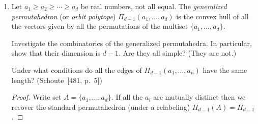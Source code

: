 \documentclass{article}
\begin{document}
\begin{enumerate}
\begin{proof}
Furthermore, $\Pi_{d-1}$ is simple because every vertex is contained exactly $d-1$ facets, which are exactly the $d-1$ cuts one can make which splits the length $d$ list (its coordinate) into two nontrivial lists (ordered partition into $2$ parts). Equivalently, every vertex is in exactly $d-1$ edges, corresponding to the $d-1$ adjacent transpositions one can make. (The vertices one adjacent transposition away are its neighbors, and adjacent here refers to the ordering of the ground set $d>d-1>\ldots > 1$)

\smallskip
Its $2^d-2$ facets correspond to the identity
\[\sum_{i=0}^{d} \binom{d}{i} = 2^d\]
which is the number of ways to split $[d]$ into two (possibly empty) sets. Since we require each set to be non-empty, we lose the partitions $(\varnothing, [d])$ and $([d], \varnothing)$, thus giving $2^d-2$ facets. Let $(S_i)_{i=1}^{2^d-2}$ be all the non-empty proper subsets of $[d]$. The hyperplanes are exactly
\[\sum_{k \in S_i} x_k \geq \sum_{k=1}^{|S_i|}k = \frac{|S_i|(|S_i|+1)}{2}\]
for each facet corresponding to $(S_i, [d] \setminus S_i)$.

\begin{remark}
Let the (cartesian) directions in $\mathbb{R}^d$ be $x_1, \dots, x_d$. Let $P$ be the plane $\sum_{i=1}^d x_i = \sum_{i=1}^d$. We have that $\Pi_{d-1} \subseteq P$, so if we take $P$ as $\mathbb{R}^{d-1}$ (via an affine transformation) we can actually see $\Pi_{d-1}$ is in $\mathbb{R}^{d-1}$. This is how $\Pi_3$ is drawn 3D, for example, even though it sits in $\mathbb{R}^4$
\end{remark}
\end{proof}

\item Let $a_{1}\ge a_{2}\ge \cdots \ge a_{d}$ be real numbers, not all equal. 
The \emph{generalized permutahedron} (or \emph{orbit polytope}) 
$\Pi_{d-1}(a_{1},\ldots,a_{d})$ is the convex hull of all the vectors
given by all the permutations of the multiset $\{a_{1},\ldots,a_{d}\}$.

\smallskip
Investigate the combinatorics of the generalized permutahedra. In particular,
show that their dimension is $d-1$. Are they all simple? (They are not.)

\smallskip
Under what conditions do all the edges of 
$\Pi_{d-1}(a_{1},\ldots,a_{n})$ have the same length?
(Schoute~[481, p.~5])

\begin{proof}
Write set $A = \{a_1, ..., a_d\}$. If all the $a_i$ are mutually distinct then we recover the standard permutahedron (under a relabeling) $\Pi_{d-1}(A) = \Pi_{d-1}$. 


\end{proof}
\end{enumerate}
\end{document}
